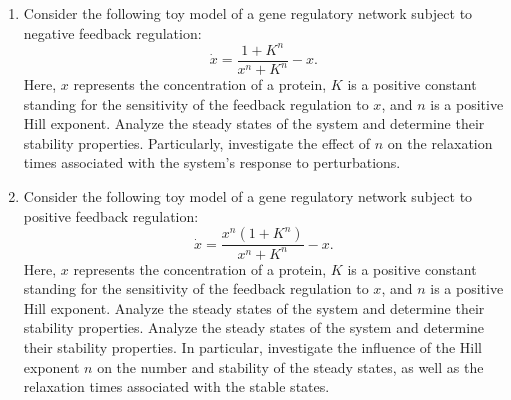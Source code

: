 \begin{enumerate}

\item Consider the following toy model of a gene regulatory network subject to negative feedback regulation:
\begin{equation*}
    \dot{x} = \frac{1 + K^n}{x^n + K^n} - x.
\end{equation*}
Here, $x$ represents the concentration of a protein, $K$ is a positive constant standing for the sensitivity of the feedback regulation to $x$, and $n$ is a positive Hill exponent. Analyze the steady states of the system and determine their stability properties. Particularly, investigate the effect of $n$  on the relaxation times associated with the system's response to perturbations.

\item Consider the following toy model of a gene regulatory network subject to positive feedback regulation:
\begin{equation*}
    \dot{x} = \frac{x^n (1 + K^n)}{x^n + K^n} - x.
\end{equation*}
Here, $x$ represents the concentration of a protein, $K$ is a positive constant standing for the sensitivity of the feedback regulation to $x$, and $n$ is a positive Hill exponent. Analyze the steady states of the system and determine their stability properties. Analyze the steady states of the system and determine their stability properties. In particular, investigate the influence of the Hill exponent $n$ on the number and stability of the steady states, as well as the relaxation times associated with the stable states.
\end{enumerate}